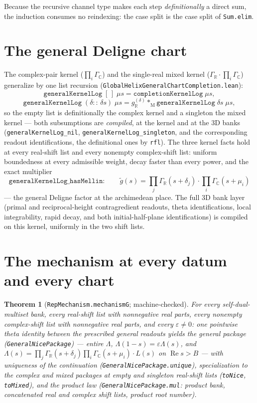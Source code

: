 \documentclass[11pt]{article}
\newtheorem{theorem}{Theorem}
\newcommand{\Gm}{\Gamma_{\mathbb C}}
\newcommand{\Gr}{\Gamma_{\mathbb R}}
\begin{document}
Because the recursive channel type makes each step \emph{definitionally} a direct sum,
the induction consumes no reindexing: the case split is the case split of
\texttt{Sum.elim}.

\section{The general Deligne chart}

The complex-pair kernel ($\prod_i\Gm$) and the single-real mixed kernel
($\Gr\cdot\prod_i\Gm$) generalize by one list recursion
(\texttt{GlobalHelixGeneralChartCompletion.lean}):
\[
\texttt{generalKernelLog}\;[\,]\;\mu s=\texttt{completionKernelLog}\;\mu s,
\]
\[
\texttt{generalKernelLog}\;(\delta{::}\,\delta s)\;\mu s
=g_{\mathbb R}^{(\delta)}\ast_{\mathrm M}\texttt{generalKernelLog}\;\delta s\;\mu s,
\]
so the empty list is definitionally the complex kernel and a singleton the mixed
kernel --- both subsumptions are \emph{compiled}, at the kernel and at the 3D banks
(\texttt{generalKernelLog\_nil}, \texttt{generalKernelLog\_singleton}, and the
corresponding readout identifications, the definitional ones by \texttt{rfl}).
The three kernel facts hold at every real-shift list and every nonempty
complex-shift list: uniform boundedness at every admissible weight, decay faster than
every power, and the exact multiplier
\[
\texttt{generalKernelLog\_hasMellin}:\qquad
\widetilde g(s)=\prod_j\Gr(s+\delta_j)\cdot\prod_i\Gm(s+\mu_i)
\]
--- the general Deligne factor at the archimedean place.  The full 3D bank layer
(primal and reciprocal-height contragredient readouts, theta identifications, local
integrability, rapid decay, and both initial-half-plane identifications) is compiled
on this kernel, uniformly in the two shift lists.

\section{The mechanism at every datum and every chart}

\begin{theorem}[\texttt{RepMechanism.mechanismG}; machine-checked]\label{thm:mechG}
For every self-dual-multiset bank, every real-shift list with nonnegative real parts,
every nonempty complex-shift list with nonnegative real parts, and every
$\varepsilon\neq0$: one pointwise theta identity between the prescribed general
readouts yields the general package (\texttt{GeneralNicePackage}) --- entire $\Lambda$,
$\Lambda(1-s)=\varepsilon\Lambda(s)$, and
$\Lambda(s)=\prod_j\Gr(s+\delta_j)\prod_i\Gm(s+\mu_i)\cdot L(s)$ on
$\operatorname{Re}s>B$ --- with uniqueness of the continuation
(\texttt{GeneralNicePackage.unique}), specialization to the complex and mixed packages
at empty and singleton real-shift lists (\texttt{toNice}, \texttt{toMixed}), and the
product law (\texttt{GeneralNicePackage.mul}: product bank, concatenated real and
complex shift lists, product root number).
\end{theorem}
\end{document}
